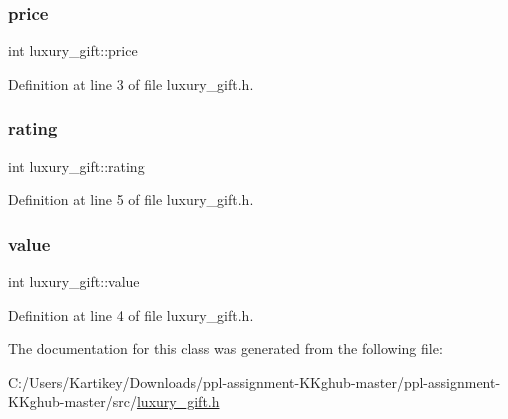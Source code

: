\subsubsection{\texorpdfstring{price}{price}}
{\footnotesize\ttfamily int luxury\+\_\+gift\+::price}



Definition at line 3 of file luxury\+\_\+gift.\+h.

\mbox{\label{classluxury__gift_a80ff7535ef8d5d3a83bcd9235982dc7a}} 
\subsubsection{\texorpdfstring{rating}{rating}}
{\footnotesize\ttfamily int luxury\+\_\+gift\+::rating}



Definition at line 5 of file luxury\+\_\+gift.\+h.

\mbox{\label{classluxury__gift_a74ba47e7c250cec99e79632f0cf1fc0d}} 
\subsubsection{\texorpdfstring{value}{value}}
{\footnotesize\ttfamily int luxury\+\_\+gift\+::value}



Definition at line 4 of file luxury\+\_\+gift.\+h.



The documentation for this class was generated from the following file\+:\begin{DoxyCompactItemize}
\item 
C\+:/\+Users/\+Kartikey/\+Downloads/ppl-\/assignment-\/\+K\+Kghub-\/master/ppl-\/assignment-\/\+K\+Kghub-\/master/src/\hyperlink{luxury__gift_8h}{luxury\+\_\+gift.\+h}\end{DoxyCompactItemize}

